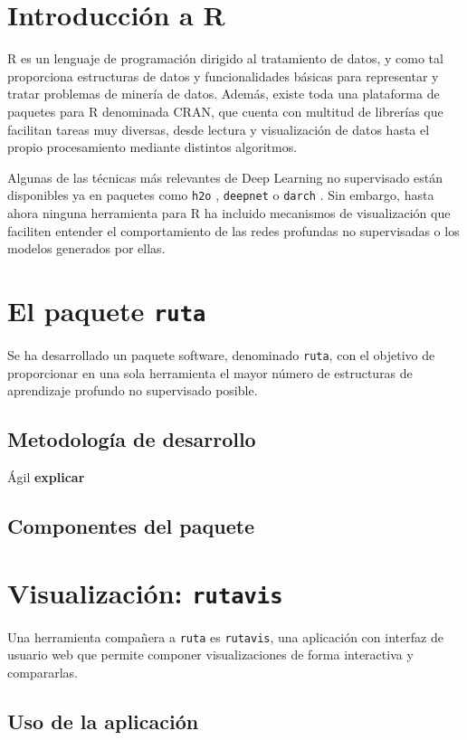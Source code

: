 \section{Introducción a R}\label{introducciuxf3n-a-r}

R es un lenguaje de programación dirigido al tratamiento de datos, y
como tal proporciona estructuras de datos y funcionalidades básicas para
representar y tratar problemas de minería de datos. Además, existe toda
una plataforma de paquetes para R denominada CRAN, que cuenta con
multitud de librerías que facilitan tareas muy diversas, desde lectura y
visualización de datos hasta el propio procesamiento mediante distintos
algoritmos.

Algunas de las técnicas más relevantes de Deep Learning no supervisado
están disponibles ya en paquetes como \texttt{h2o} \autocite{h2o},
\texttt{deepnet} \autocite{deepnet} o \texttt{darch} \autocite{darch}.
Sin embargo, hasta ahora ninguna herramienta para R ha incluido
mecanismos de visualización que faciliten entender el comportamiento de
las redes profundas no supervisadas o los modelos generados por ellas.

\section{\texorpdfstring{El paquete
\texttt{ruta}}{El paquete ruta}}\label{el-paquete-ruta}

Se ha desarrollado un paquete software, denominado \texttt{ruta}, con el
objetivo de proporcionar en una sola herramienta el mayor número de
estructuras de aprendizaje profundo no supervisado posible.

\subsection{Metodología de
desarrollo}\label{metodologuxeda-de-desarrollo}

Ágil \textbf{explicar}

\subsection{Componentes del paquete}\label{componentes-del-paquete}

\section{\texorpdfstring{Visualización:
\texttt{rutavis}}{Visualización: rutavis}}\label{visualizaciuxf3n-rutavis}

Una herramienta compañera a \texttt{ruta} es \texttt{rutavis}, una
aplicación con interfaz de usuario web que permite componer
visualizaciones de forma interactiva y compararlas.

\subsection*{Uso de la aplicación}\label{uso-de-la-aplicaciuxf3n}
